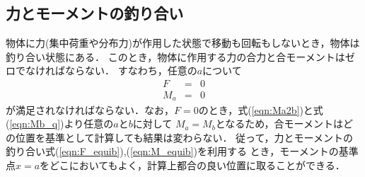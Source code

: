 \documentclass[10pt,a4j]{jbook}
\begin{document}
\subsection{力とモーメントの釣り合い}
物体に力(集中荷重や分布力)が作用した状態で移動も回転もしないとき，物体は釣り合い状態にある．
このとき，物体に作用する力の合力と合モーメントはゼロでなければならない．
すなわち，任意の$a$について
\begin{eqnarray}
	F &= &  0 
	\label{eqn:F_equib}
	\\
	M_a &= &  
	0 
	\label{eqn:M_equib}
\end{eqnarray}
が満足されなければならない．なお，$F=0$のとき，式(\ref{eqn:Ma2b})と式(\ref{eqn:Mb_q})より任意の$a$と$b$に対して
$M_a=M_b$となるため，合モーメントはどの位置を基準として計算しても結果は変わらない．
従って，力とモーメントの釣り合い式(\ref{eqn:F_equib}),(\ref{eqn:M_equib})を利用する
とき，モーメントの基準点$x=a$をどこにおいてもよく，計算上都合の良い位置に取ることができる．
\end{document}
